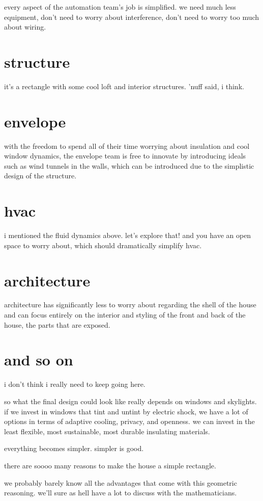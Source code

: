 \documentclass[paper=128mm:96mm, fontsize=9pt, pagesize]{scrartcl}
\begin{document}
every aspect of the automation team's job is simplified.
we need much less equipment, don't need to worry about interference, don't need to worry too much about wiring.

\clearpage

\section{structure}

it's a rectangle with some cool loft and interior structures.
'nuff said, i think.

\clearpage

\section{envelope}

with the freedom to spend all of their time worrying about insulation and cool window dynamics, the envelope team is free to innovate by introducing ideals such as wind tunnels in the walls, which can be introduced due to the simplistic design of the structure.

\clearpage

\section{hvac}

i mentioned the fluid dynamics above.
let's explore that!
and you have an open space to worry about, which should dramatically simplify hvac.

\clearpage

\section{architecture}

architecture has significantly less to worry about regarding the shell of the house and can focus entirely on the interior and styling of the front and back of the house, the parts that are exposed.

\clearpage

\section{and so on}

i don't think i really need to keep going here.

so what the final design could look like really depends on windows and skylights.
if we invest in windows that tint and untint by electric shock, we have a lot of options in terms of adaptive cooling, privacy, and openness.
we can invest in the least flexible, most sustainable, most durable insulating materials.

everything becomes simpler.
simpler is good.

there are soooo many reasons to make the house a simple rectangle.

we probably barely know all the advantages that come with this geometric reasoning.
we'll sure as hell have a lot to discuss with the mathematicians. 

\clearpage

\end{document}
